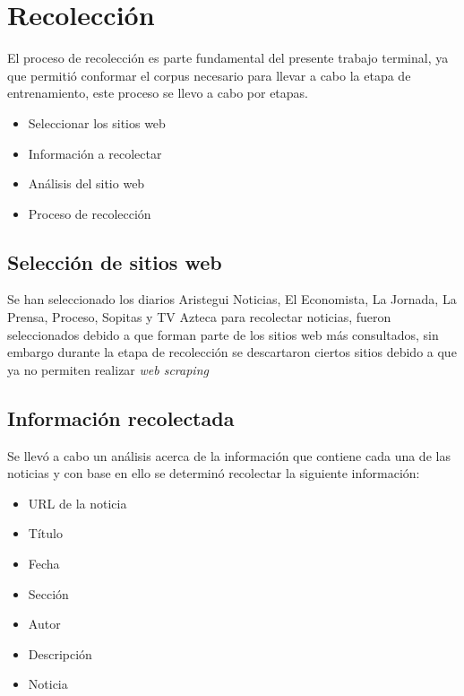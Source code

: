 \section{Recolección}


El proceso de recolección es parte fundamental del presente trabajo terminal, ya que permitió conformar el corpus necesario para llevar a cabo la etapa de entrenamiento, este proceso se llevo a cabo por etapas.

\begin{itemize}
	\item Seleccionar los sitios web
	\item Información a recolectar
	\item Análisis del sitio web
	\item Proceso de recolección
\end{itemize}

\subsection{Selección de sitios web}

Se han seleccionado los diarios Aristegui Noticias, El Economista, La Jornada, La Prensa, Proceso, Sopitas y TV Azteca para recolectar noticias, fueron seleccionados debido a que forman parte de los sitios web más consultados, sin embargo durante la etapa de recolección se descartaron ciertos sitios debido a que ya no permiten realizar \textit{web scraping}


\subsection{Información recolectada}

Se llevó a cabo un análisis acerca de la información que contiene cada una de las noticias y con base en ello se determinó recolectar la siguiente información:

\begin{itemize}
	\item URL de la noticia
	\item Título
	\item Fecha
	\item Sección
	\item Autor
	\item Descripción
	\item Noticia
\end{itemize}

